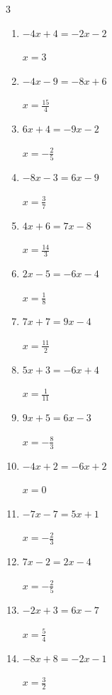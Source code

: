 \begin{multicols}{3}
\begin{enumerate}
        $\displaystyle x=\frac{4}{5}$

  \item $-4x+4=-2x-2$

        $\displaystyle x=3$

  \item $-4x-9=-8x+6$

        $\displaystyle x=\frac{15}{4}$

  \item $6x+4=-9x-2$

        $\displaystyle x=-\frac{2}{5}$

  \item $-8x-3=6x-9$

        $\displaystyle x=\frac{3}{7}$

  \item $4x+6=7x-8$

        $\displaystyle x=\frac{14}{3}$

  \item $2x-5=-6x-4$

        $\displaystyle x=\frac{1}{8}$

  \item $7x+7=9x-4$

        $\displaystyle x=\frac{11}{2}$

  \item $5x+3=-6x+4$

        $\displaystyle x=\frac{1}{11}$

\columnbreak %

  \item $9x+5=6x-3$

        $\displaystyle x=-\frac{8}{3}$

  \item $-4x+2=-6x+2$

        $\displaystyle x=0$

  \item $-7x-7=5x+1$

        $\displaystyle x=-\frac{2}{3}$

  \item $7x-2=2x-4$

        $\displaystyle x=-\frac{2}{5}$

  \item $-2x+3=6x-7$

        $\displaystyle x=\frac{5}{4}$

  \item $-8x+8=-2x-1$

        $\displaystyle x=\frac{3}{2}$


\end{enumerate}
\end{multicols}
